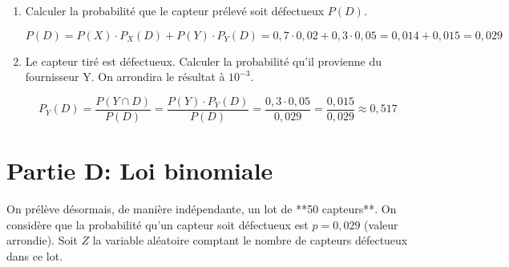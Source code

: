 \documentclass[11pt, a4paper]{report}
\begin{document}
\begin{enumerate}[resume]
\begin{minipage}{0.49\linewidth}
\begin{blocvisible}[height=5]
    \end{blocvisible}
\end{minipage}

\medskip

    \item Calculer la probabilité que le capteur prélevé soit défectueux $P(D)$.
    \begin{blocvisible}[height=3]
        \[P(D) = P(X) \cdot P_X(D) + P(Y) \cdot P_Y(D) = 0,7 \cdot 0,02 + 0,3 \cdot 0,05 = 0,014 + 0,015 = 0,029\]
    \end{blocvisible}

    \medskip

    \item Le capteur tiré est défectueux. Calculer la probabilité qu'il provienne du fournisseur Y. On arrondira le résultat à $10^{-3}$.
    \begin{blocvisible}[height=3]
        \[P_Y(D) = \frac{P(Y\cap D)}{P(D)}= \frac{P(Y) \cdot P_Y(D)}{P(D)} = \frac{0,3 \cdot 0,05}{0,029} = \frac{0,015}{0,029} \approx 0,517\]
    \end{blocvisible}
\end{enumerate}

\pagebreak
    \thispagestyle{DS_LP}

\section*{Partie D\@: Loi binomiale}

On prélève désormais, de manière indépendante, un lot de **50 capteurs**. On considère que la probabilité qu'un capteur soit défectueux est $p = 0,029$ (valeur arrondie). Soit $Z$ la variable aléatoire comptant le nombre de capteurs défectueux dans ce lot.
\end{document}
